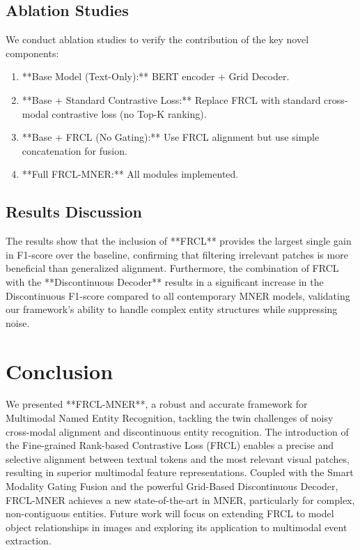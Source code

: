 \documentclass[runningheads]{llncs}
\begin{document}
\subsection{Ablation Studies}
We conduct ablation studies to verify the contribution of the key novel components:
\begin{enumerate}
    \item **Base Model (Text-Only):** BERT encoder + Grid Decoder.
    \item **Base + Standard Contrastive Loss:** Replace FRCL with standard cross-modal contrastive loss (no Top-K ranking).
    \item **Base + FRCL (No Gating):** Use FRCL alignment but use simple concatenation for fusion.
    \item **Full FRCL-MNER:** All modules implemented.
\end{enumerate}

\subsection{Results Discussion}
The results show that the inclusion of **FRCL** provides the largest single gain in F1-score over the baseline, confirming that filtering irrelevant patches is more beneficial than generalized alignment. Furthermore, the combination of FRCL with the **Discontinuous Decoder** results in a significant increase in the Discontinuous F1-score compared to all contemporary MNER models, validating our framework's ability to handle complex entity structures while suppressing noise.

\section{Conclusion}

We presented **FRCL-MNER**, a robust and accurate framework for Multimodal Named Entity Recognition, tackling the twin challenges of noisy cross-modal alignment and discontinuous entity recognition. The introduction of the Fine-grained Rank-based Contrastive Loss (FRCL) enables a precise and selective alignment between textual tokens and the most relevant visual patches, resulting in superior multimodal feature representations. Coupled with the Smart Modality Gating Fusion and the powerful Grid-Based Discontinuous Decoder, FRCL-MNER achieves a new state-of-the-art in MNER, particularly for complex, non-contiguous entities. Future work will focus on extending FRCL to model object relationships in images and exploring its application to multimodal event extraction.



\end{document}
